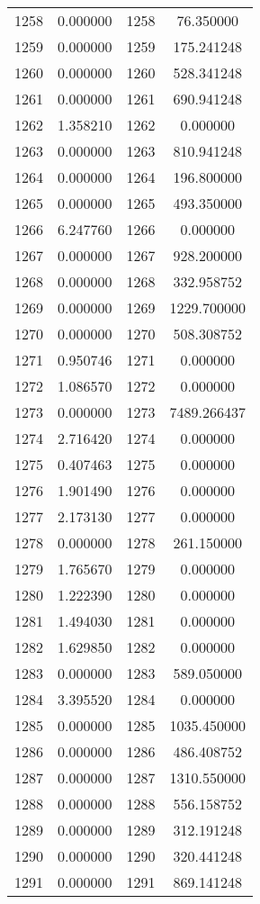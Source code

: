 \documentclass[12pt]{article}
\begin{document}
\begin{longtable}{@{}cccc@{}}
1258 & 0.000000 & 1258 & 76.350000 \\
1259 & 0.000000 & 1259 & 175.241248 \\
1260 & 0.000000 & 1260 & 528.341248 \\
1261 & 0.000000 & 1261 & 690.941248 \\
1262 & 1.358210 & 1262 & 0.000000 \\
1263 & 0.000000 & 1263 & 810.941248 \\
1264 & 0.000000 & 1264 & 196.800000 \\
1265 & 0.000000 & 1265 & 493.350000 \\
1266 & 6.247760 & 1266 & 0.000000 \\
1267 & 0.000000 & 1267 & 928.200000 \\
1268 & 0.000000 & 1268 & 332.958752 \\
1269 & 0.000000 & 1269 & 1229.700000 \\
1270 & 0.000000 & 1270 & 508.308752 \\
1271 & 0.950746 & 1271 & 0.000000 \\
1272 & 1.086570 & 1272 & 0.000000 \\
1273 & 0.000000 & 1273 & 7489.266437 \\
1274 & 2.716420 & 1274 & 0.000000 \\
1275 & 0.407463 & 1275 & 0.000000 \\
1276 & 1.901490 & 1276 & 0.000000 \\
1277 & 2.173130 & 1277 & 0.000000 \\
1278 & 0.000000 & 1278 & 261.150000 \\
1279 & 1.765670 & 1279 & 0.000000 \\
1280 & 1.222390 & 1280 & 0.000000 \\
1281 & 1.494030 & 1281 & 0.000000 \\
1282 & 1.629850 & 1282 & 0.000000 \\
1283 & 0.000000 & 1283 & 589.050000 \\
1284 & 3.395520 & 1284 & 0.000000 \\
1285 & 0.000000 & 1285 & 1035.450000 \\
1286 & 0.000000 & 1286 & 486.408752 \\
1287 & 0.000000 & 1287 & 1310.550000 \\
1288 & 0.000000 & 1288 & 556.158752 \\
1289 & 0.000000 & 1289 & 312.191248 \\
1290 & 0.000000 & 1290 & 320.441248 \\
1291 & 0.000000 & 1291 & 869.141248 \\

\end{longtable}
\end{document}
